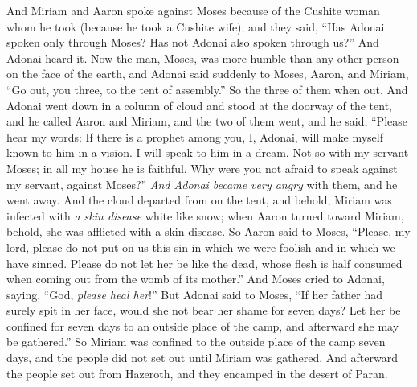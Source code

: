 \begin{biblechapter} %
 And Miriam and Aaron spoke against Moses because of the Cushite woman whom he took (because he took a Cushite wife);
\verse and they said, “Has Adonai spoken only through Moses? Has not Adonai also spoken through us?” And Adonai heard it.
\verse Now the man, Moses, was more humble than any other person on the face of the earth,
\verse and Adonai said suddenly to Moses, Aaron, and Miriam, “Go out, you three, to the tent of assembly.” So the three of them when out.
\verse And Adonai went down in a column of cloud and stood at the doorway of the tent, and he called Aaron and Miriam, and the two of them went,
\verse and he said,
\verse “Please hear my words: 
If there is a prophet among you, I, Adonai, 
will make myself known to him in a vision. 
I will speak to him in a dream.
\verse Not so with my servant Moses; 
in all my house he is faithful. Why were you not afraid to speak against my servant, against Moses?”
\verse \textit{And Adonai became very angry} with them, and he went away.
\verse And the cloud departed from on the tent, and behold, Miriam was infected with \textit{a skin disease} white like snow; when Aaron turned toward Miriam, behold, she was afflicted with a skin disease.
\verse So Aaron said to Moses, “Please, my lord, please do not put on us this sin in which we were foolish and in which we have sinned.
\verse Please do not let her be like the dead, whose flesh is half consumed when coming out from the womb of its mother.”
\verse And Moses cried to Adonai, saying, “God, \textit{please heal her}!”
\verse But Adonai said to Moses, “If her father had surely spit in her face, would she not bear her shame for seven days? Let her be confined for seven days to an outside place of the camp, and afterward she may be gathered.”
\verse So Miriam was confined to the outside place of the camp seven days, and the people did not set out until Miriam was gathered.
\verse And afterward the people set out from Hazeroth, and they encamped in the desert of Paran.
\end{biblechapter}

